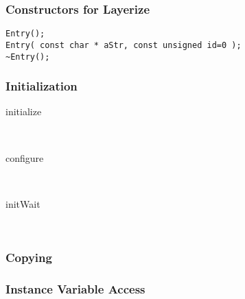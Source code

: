 \subsubsection{Constructors for Layerize}
\begin{verbatim}
Entry();
Entry( const char * aStr, const unsigned id=0 );
~Entry();
\end{verbatim}

\subsubsection{Initialization}
\begin{description}
\item[initialize] \texonly{---} \\

\label{sec:entry-configure}
\item[configure] \texonly{---} \\

\label{sec:entry-initWait}
\item[initWait] \texonly{---} \\

\end{description}
\subsubsection{Copying}
\subsubsection{Instance Variable Access}

